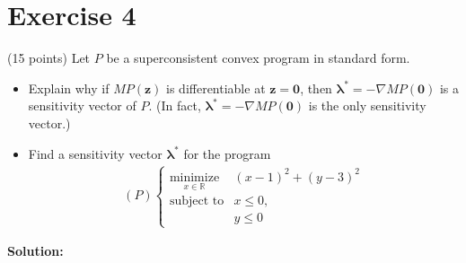 \documentclass{article}
\begin{document}
\newpage

\section*{Exercise 4}
(15 points) Let $P$ be a superconsistent convex program in standard form.
\begin{itemize}
\item Explain why if $MP(\mathbf{z})$ is differentiable at $\mathbf{z} = \mathbf{0}$, then $\boldsymbol{\lambda}^* = -\nabla MP(\mathbf{0})$ is a sensitivity vector of $P$. (In fact, $\boldsymbol{\lambda}^* = -\nabla MP(\mathbf{0})$ is the only sensitivity vector.)
\item Find a sensitivity vector $\boldsymbol{\lambda}^*$ for the program
\begin{align*}
(P) \begin{cases}
\underset{x\in\mathbb{R}}{\text{minimize}} & (x - 1)^2 + (y - 3)^2 \\
\text{subject to} & x \leq 0, \\
& y \leq 0
\end{cases}
\end{align*}
\end{itemize}

\textbf{Solution:} \\
\end{document}
